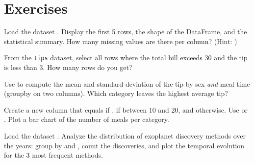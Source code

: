\section{Exercises}

\begin{exercise}[$\star$]
Load the dataset . Display the first 5 rows,
the shape of the DataFrame, and the statistical summary. How many missing values
are there per column? (Hint: )
\end{exercise}

\begin{exercise}[$\star$]
From the \texttt{tips} dataset, select all rows where the total bill
exceeds 30 and the tip is less than 3. How many rows do you get?
\end{exercise}

\begin{exercise}[$\star\star$]
Use  to compute the mean and standard deviation of the tip
by sex \emph{and} meal time (groupby on two columns).
Which category leaves the highest average tip?
\end{exercise}

\begin{exercise}[$\star\star$]
Create a new column  that equals  if
,  if between 10 and 20, and  otherwise.
Use  or . Plot a bar chart of the number
of meals per category.
\end{exercise}

\begin{exercise}[$\star\star\star$]
Load the dataset . Analyze the distribution of
exoplanet discovery methods over the years: group by
 and , count the discoveries, and plot the temporal evolution
for the 3 most frequent methods.
\end{exercise}

